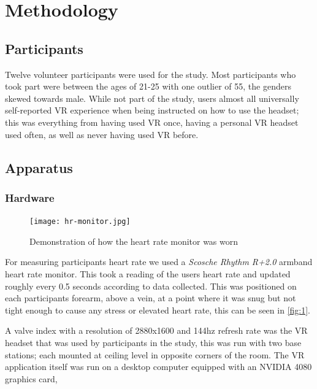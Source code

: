 \documentclass[manuscript,screen,review]{acmart}
\begin{document}
\section{Methodology}
\subsection{Participants}
Twelve volunteer participants were used for the study. Most participants who took part were between the ages of 21-25 with one outlier of 55, the genders skewed towards male. While not part of the study, users almost all universally self-reported VR experience when being instructed on how to use the headset; this was everything from having used VR once, having a personal VR headset used often, as well as never having used VR before.

\subsection{Apparatus}
\subsubsection{Hardware}
\begin{figure}
    \centering
    \texttt{[image: hr-monitor.jpg]}
    \caption{Demonstration of how the heart rate monitor was worn}
    \label{fig:1}
\end{figure}
For measuring participants heart rate we used a \textit{Scosche Rhythm R+2.0} armband heart rate monitor. This took a reading of the users heart rate and updated roughly every 0.5 seconds according to data collected. This was positioned on each participants forearm, above a vein, at a point where it was snug but not tight enough to cause any stress or elevated heart rate, this can be seen in \autoref{fig:1}.

A valve index with a resolution of 2880x1600 and 144hz refresh rate was the VR headset that was used by participants in the study, this was run with two base stations; each mounted at ceiling level in opposite corners of the room. The VR application itself was run on a desktop computer equipped with an NVIDIA 4080 graphics card,
\end{document}
